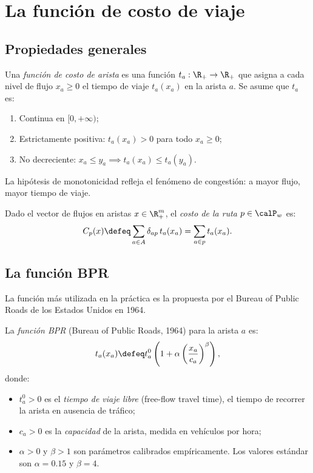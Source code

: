 
\section{La función de costo de viaje}

\subsection{Propiedades generales}


\begin{definition}
Una \emph{función de costo de arista} es una función $t_a : \R_+ \to \R_+$ que asigna a cada nivel de flujo $x_a \geq 0$ el tiempo de viaje $t_a(x_a)$ en la arista $a$. Se asume que $t_a$ es:
\begin{enumerate}
    \item Continua en $[0, +\infty)$;
    \item Estrictamente positiva: $t_a(x_a) > 0$ para todo $x_a \geq 0$;
    \item No decreciente: $x_a \leq y_a \implies t_a(x_a) \leq t_a(y_a)$.
\end{enumerate}
La hipótesis de monotonicidad refleja el fenómeno de congestión: a mayor flujo, mayor tiempo de viaje.
\end{definition}

\begin{definition}
Dado el vector de flujos en aristas $x \in \R^m_+$, el \emph{costo de la ruta} $p \in \calP_w$ es:
\[
C_p(x) \defeq \sum_{a \in A} \delta_{ap} \, t_a(x_a) = \sum_{a \in p} t_a(x_a).
\]
\end{definition}

\subsection{La función BPR}

La función más utilizada en la práctica es la propuesta por el Bureau of Public Roads de los Estados Unidos en 1964.

\begin{definition}
La \emph{función BPR} (Bureau of Public Roads, 1964) para la arista $a$ es:
\[
t_a(x_a) \defeq t_a^0 \left(1 + \alpha \left(\frac{x_a}{c_a}\right)^\beta \right),
\]
donde:
\begin{itemize}
    \item $t_a^0 > 0$ es el \emph{tiempo de viaje libre} (free-flow travel time), el tiempo de recorrer la arista en ausencia de tráfico;
    \item $c_a > 0$ es la \emph{capacidad} de la arista, medida en vehículos por hora;
    \item $\alpha > 0$ y $\beta > 1$ son parámetros calibrados empíricamente. Los valores estándar son $\alpha = 0.15$ y $\beta = 4$.
\end{itemize}
\end{definition}

